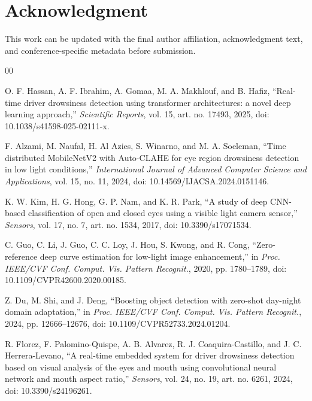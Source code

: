 \documentclass[conference]{IEEEtran}
\begin{document}
\section*{Acknowledgment}

This work can be updated with the final author affiliation, acknowledgment text, and conference-specific metadata before submission.

\balance
\begin{thebibliography}{00}

O. F. Hassan, A. F. Ibrahim, A. Gomaa, M. A. Makhlouf, and B. Hafiz, ``Real-time driver drowsiness detection using transformer architectures: a novel deep learning approach,'' \emph{Scientific Reports}, vol. 15, art. no. 17493, 2025, doi: 10.1038/s41598-025-02111-x.

F. Alzami, M. Naufal, H. Al Azies, S. Winarno, and M. A. Soeleman, ``Time distributed MobileNetV2 with Auto-CLAHE for eye region drowsiness detection in low light conditions,'' \emph{International Journal of Advanced Computer Science and Applications}, vol. 15, no. 11, 2024, doi: 10.14569/IJACSA.2024.0151146.

K. W. Kim, H. G. Hong, G. P. Nam, and K. R. Park, ``A study of deep CNN-based classification of open and closed eyes using a visible light camera sensor,'' \emph{Sensors}, vol. 17, no. 7, art. no. 1534, 2017, doi: 10.3390/s17071534.

C. Guo, C. Li, J. Guo, C. C. Loy, J. Hou, S. Kwong, and R. Cong, ``Zero-reference deep curve estimation for low-light image enhancement,'' in \emph{Proc. IEEE/CVF Conf. Comput. Vis. Pattern Recognit.}, 2020, pp. 1780--1789, doi: 10.1109/CVPR42600.2020.00185.

Z. Du, M. Shi, and J. Deng, ``Boosting object detection with zero-shot day-night domain adaptation,'' in \emph{Proc. IEEE/CVF Conf. Comput. Vis. Pattern Recognit.}, 2024, pp. 12666--12676, doi: 10.1109/CVPR52733.2024.01204.

R. Florez, F. Palomino-Quispe, A. B. Alvarez, R. J. Coaquira-Castillo, and J. C. Herrera-Levano, ``A real-time embedded system for driver drowsiness detection based on visual analysis of the eyes and mouth using convolutional neural network and mouth aspect ratio,'' \emph{Sensors}, vol. 24, no. 19, art. no. 6261, 2024, doi: 10.3390/s24196261.

\end{thebibliography}
\end{document}
